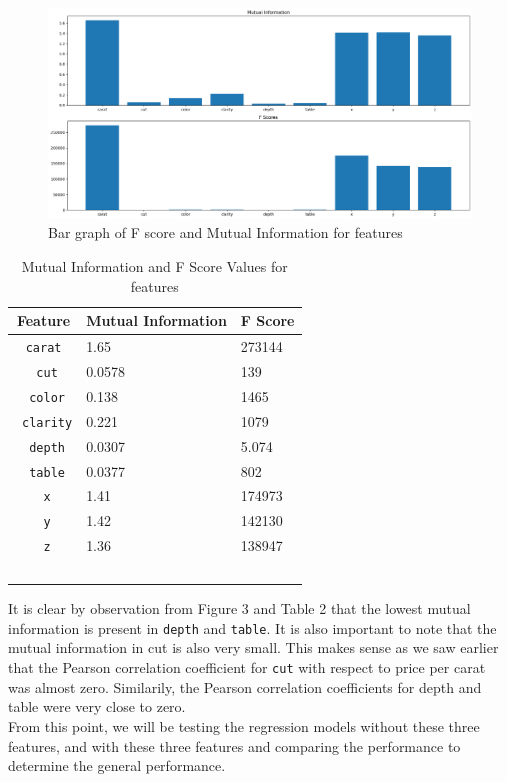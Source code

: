 \documentclass[11pt,letterpaper]{article}
\begin{document}
\begin{figure}[H]
    \centering
   \includegraphics[width=0.8\linewidth]{../Figures/Question2/mi.png}
   \caption{Bar graph of F score and Mutual Information for features}
\end{figure}
\begin{table}[!ht]
    \centering
    \begin{tabular}{c l l}
    \hline
        Feature & Mutual Information & F Score \\ \hline
        \texttt{carat} & 1.65 & 273144 \\ \
        \texttt{cut} & 0.0578 & 139 \\ \
        \texttt{color} & 0.138 & 1465 \\ \
        \texttt{clarity} & 0.221 & 1079 \\ \
        \texttt{depth} & 0.0307 & 5.074 \\ \
        \texttt{table} & 0.0377 & 802 \\ \
        \texttt{x} & 1.41 & 174973 \\ \
       \texttt{y} & 1.42 & 142130 \\ \
        \texttt{z} & 1.36 & 138947 \\ \
    \end{tabular}
    \caption{Mutual Information and F Score Values for features}
\end{table}

It is clear by observation from Figure 3 and Table 2 that the lowest mutual 
information is present in \texttt{depth} and \texttt{table}. It is also 
important to note that the mutual information in cut is also very small. This 
makes sense as we saw earlier that the Pearson correlation coefficient for 
\texttt{cut} with respect to price per carat was almost zero. Similarily, the 
Pearson correlation coefficients for depth and table were very close to zero. \\

From this point, we will be testing the regression models without these three 
features, and with these three features and comparing the performance to 
determine the general performance.
\end{document}
